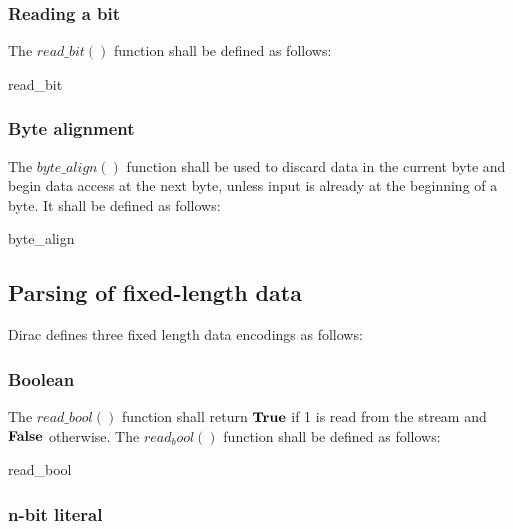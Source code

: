 \subsubsection{Reading a bit}\label{readbit}

The $read\_bit()$ function shall be defined as follows:

\begin{pseudo}{read\_bit}{}
\bsEND
{}
\end{pseudo}

\subsubsection{Byte alignment}\label{bytealign}

The $byte\_align()$ function shall be used to discard data in the current byte 
and begin data access at the next byte, unless input is already at the beginning
 of a byte. It shall be defined as follows: 

\begin{pseudo}{byte\_align}{}
\bsEND
\end{pseudo}

\subsection{Parsing of fixed-length data}

Dirac defines three fixed length data encodings as follows:

\subsubsection{Boolean}

The $read\_bool()$ function shall return $\text{\bf{True}}$ if 1 is read from the stream and 
$\text{\bf{False}}$ otherwise. The $read_bool()$ function shall be defined as follows:

\begin{pseudo}{read\_bool}{}
    \bsRET{\true}
\bsELSE
    \bsRET{\false}
\bsEND
\end{pseudo}

\subsubsection{n-bit literal}\label{readnbits}

